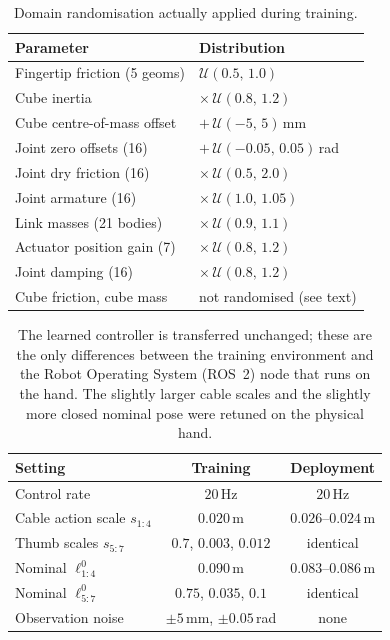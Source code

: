 \documentclass[11pt]{article}
\begin{document}
\begin{table}[!htbp]
    \centering
    \begin{tabular}{ll}
    \toprule
    Parameter & Distribution \\
    \midrule
    Fingertip friction (5 geoms)     & $\mathcal{U}(0.5,\,1.0)$ \\
    Cube inertia                     & $\times\,\mathcal{U}(0.8,\,1.2)$ \\
    Cube centre-of-mass offset       & $+\,\mathcal{U}(-5,\,5)$\,mm \\
    Joint zero offsets (16)          & $+\,\mathcal{U}(-0.05,\,0.05)$\,rad \\
    Joint dry friction (16)          & $\times\,\mathcal{U}(0.5,\,2.0)$ \\
    Joint armature (16)              & $\times\,\mathcal{U}(1.0,\,1.05)$ \\
    Link masses (21 bodies)          & $\times\,\mathcal{U}(0.9,\,1.1)$ \\
    Actuator position gain (7)       & $\times\,\mathcal{U}(0.8,\,1.2)$ \\
    Joint damping (16)               & $\times\,\mathcal{U}(0.8,\,1.2)$ \\
    \midrule
    Cube friction, cube mass         & not randomised (see text) \\
    \bottomrule
    \end{tabular}
    \caption{Domain randomisation actually applied during training.}
    \label{tbl:dr}
\end{table}

\begin{table}[!htbp]
    \centering
    \small
    \begin{tabular}{lcc}
    \toprule
    Setting & Training & Deployment \\
    \midrule
    Control rate                & $20$\,Hz & $20$\,Hz \\
    Cable action scale $s_{1:4}$& $0.020$\,m & $0.026$--$0.024$\,m \\
    Thumb scales $s_{5:7}$      & $0.7$, $0.003$, $0.012$ & identical \\
    Nominal $\ell^{0}_{1:4}$    & $0.090$\,m & $0.083$--$0.086$\,m \\
    Nominal $\ell^{0}_{5:7}$    & $0.75$, $0.035$, $0.1$ & identical \\
    Observation noise           & $\pm5$\,mm, $\pm0.05$\,rad & none \\
    \bottomrule
    \end{tabular}
    \caption{The learned controller is transferred unchanged; these are the only differences between the training environment and the Robot Operating System (ROS~2) node that runs on the hand. The slightly larger cable scales and the slightly more closed nominal pose were retuned on the physical hand.}
    \label{tbl:policycfg}
\end{table}
\end{document}
